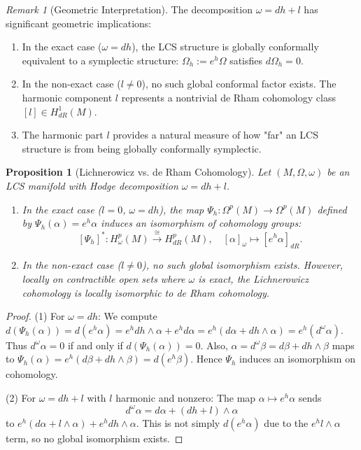 \documentclass[11pt,a4paper]{amsart}
\newtheorem{proposition}[theorem]{Proposition}
\theoremstyle{definition}
\theoremstyle{remark}
\newtheorem{remark}[theorem]{Remark}
\begin{document}
	
	\begin{remark}[Geometric Interpretation]
		The decomposition $\omega = dh + l$ has significant geometric implications:
		\begin{enumerate}
			\item In the exact case ($\omega = dh$), the LCS structure is globally conformally equivalent to a symplectic structure: $\Omega_h := e^h\Omega$ satisfies $d\Omega_h = 0$.
			\item In the non-exact case ($l \neq 0$), no such global conformal factor exists. The harmonic component $l$ represents a nontrivial de Rham cohomology class $[l] \in H^1_{dR}(M)$.
			\item The harmonic part $l$ provides a natural measure of how "far" an LCS structure is from being globally conformally symplectic.
		\end{enumerate}
	\end{remark}
	
	\begin{proposition}[Lichnerowicz vs. de Rham Cohomology]
		Let $(M, \Omega, \omega)$ be an LCS manifold with Hodge decomposition $\omega = dh + l$.
		\begin{enumerate}
			\item In the exact case ($l=0$, $\omega = dh$), the map $\Psi_h : \Omega^p(M) \to \Omega^p(M)$ defined by $\Psi_h(\alpha) = e^h \alpha$ induces an isomorphism of cohomology groups:
			\[
			[\Psi_h]^* : H_\omega^p(M) \xrightarrow{\cong} H_{dR}^p(M), \quad [\alpha]_\omega \mapsto [e^h \alpha]_{dR}.
			\]
			
			\item In the non-exact case ($l \neq 0$), no such global isomorphism exists. However, locally on contractible open sets where $\omega$ is exact, the Lichnerowicz cohomology is locally isomorphic to de Rham cohomology.
		\end{enumerate}
	\end{proposition}
	
	\begin{proof}
		(1) For $\omega = dh$: We compute $d(\Psi_h(\alpha)) = d(e^h \alpha) = e^h dh \wedge \alpha + e^h d\alpha = e^h(d\alpha + dh \wedge \alpha) = e^h(d^\omega \alpha)$. Thus $d^\omega \alpha = 0$ if and only if $d(\Psi_h(\alpha)) = 0$. Also, $\alpha = d^\omega \beta = d\beta + dh \wedge \beta$ maps to $\Psi_h(\alpha) = e^h(d\beta + dh \wedge \beta) = d(e^h \beta)$. Hence $\Psi_h$ induces an isomorphism on cohomology.
		
		(2) For $\omega = dh + l$ with $l$ harmonic and nonzero: The map $\alpha \mapsto e^h \alpha$ sends $$d^\omega \alpha = d\alpha + (dh + l) \wedge \alpha$$ to $e^h(d\alpha + l \wedge \alpha) + e^h dh \wedge \alpha.$ This is not simply $d(e^h \alpha)$ due to the $e^h l \wedge \alpha$ term, so no global isomorphism exists.
	\end{proof}
	
\end{document}
